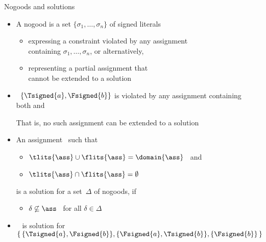 \begin{frame}{Nogoods and solutions}
  \bigskip
  \begin{itemize}
  \item<2-> A \alert{nogood} is a set $\{\sigma_1,\ldots,\sigma_n\}$ of signed literals
    \begin{itemize}\normalsize
    \item<only@3-6> expressing a \alert{constraint} violated by any assignment
      \\containing $\sigma_1,\ldots,\sigma_n$, or alternatively,
    \item<only@3-6> representing a partial assignment that
      \\cannot be extended to a solution
      \medskip
    \end{itemize}
  \item<only@4 >  \ $\{\Tsigned{a},\Fsigned{b}\}$
    is violated by any assignment containing
    \\ both  and 
    \par\smallskip
    That is, no such assignment can be extended to a solution
  \item<only@6-> An assignment \ass\ such that
    \par\smallskip
    \begin{itemize}\normalsize
    \item \( \tlits{\ass} \cup \flits{\ass} = \domain{\ass} \) \ and
      \smallskip
    \item \( \tlits{\ass} \cap \flits{\ass} = \emptyset \)
    \end{itemize}
    \par\smallskip
    is a \alert{solution} for a set~$\Delta$ of nogoods,
    if
    \par\smallskip
    \begin{itemize}\normalsize
    \item $\delta\not\subseteq\ass$ \ for all $\delta\in\Delta$
    \end{itemize}
    \bigskip
  \item<only@8- >  \ 
    is  solution for
    \(
    \{\,\{\Tsigned{a},\Fsigned{b}\},\{\Fsigned{a},\Tsigned{b}\},\{\Fsigned{b}\}\,\}
    \)
  \end{itemize}
\end{frame}
